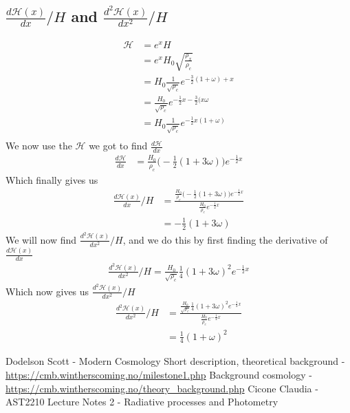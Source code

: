 \documentclass{article}
\begin{document}
\subsection{$\frac{d\mathcal{H}(x)}{dx}/H$ and $\frac{d^2\mathcal{H}(x)}{dx^2}/H$}
\begin{align*}
    {\mathcal{H}}&=e^xH\\
    &=e^xH_0\sqrt{\frac{\rho_x}{\rho_c}}\\
    &=H_0\frac{1}{\sqrt{\rho_c}}e^{-\frac{3}{2}(1+\omega)+x}\\
    &=\frac{H_0}{\sqrt{\rho_c}}e^{-\frac{1}{2}x-\frac{3}{2}(x\omega}\\
    &=H_0\frac{1}{\sqrt{\rho_c}}e^{-\frac{1}{2}x(1+\omega)}\\
\end{align*}
We now use the $\mathcal{H}$ we got to find $\frac{d\mathcal{H}}{dx}$ 
\begin{align*}
    \frac{d\mathcal{H}}{dx}&=\frac{H_0}{\rho_c}\bigg(-\frac{1}{2}(1+3\omega)\bigg)e^{-\frac{1}{2}x}
\end{align*}
Which finally gives us 
\begin{align}
    {\frac{d\mathcal{H}(x)}{dx}/H}&=\frac{\frac{H_0}{\rho_c}\bigg(-\frac{1}{2}(1+3\omega)\bigg)e^{-\frac{1}{2}x}}{\frac{H_0}{\rho_c}e^{-\frac{1}{2}x}}\\
    &=-\frac{1}{2}(1+3\omega)
\end{align}
We will now find $\frac{d^2\mathcal{H}(x)}{dx^2}/H$, and we do this by first finding the derivative of $\frac{d\mathcal{H}(x)}{dx}$
\begin{align}
    \frac{d^2\mathcal{H}(x)}{dx^2}/H=\frac{H_0}{\sqrt{\rho_c}}\frac{1}{4}(1+3\omega)^2e^{-\frac{1}{2}x} 
\end{align}
Which now gives us $\frac{d^2\mathcal{H}(x)}{dx^2}/H$
\begin{align}
    \frac{d^2\mathcal{H}(x)}{dx^2}/H&=\frac{\frac{H_0}{\sqrt{\rho_c}}\frac{1}{4}(1+3\omega)^2e^{-\frac{1}{2}x} }{\frac{H_0}{\rho_c}e^{-\frac{1}{2}x}}\\
    &=\frac{1}{4}(1+\omega)^2
\end{align}
\begin{thebibliography}{9}
    Dodelson Scott - Modern Cosmology 
	Short description, theoretical background - \url{https://cmb.wintherscoming.no/milestone1.php} 
	Background cosmology - \url{https://cmb.wintherscoming.no/theory_background.php} 
    Cicone Claudia - AST2210 Lecture Notes 2 - Radiative processes and Photometry 
\end{thebibliography}
\end{document}
